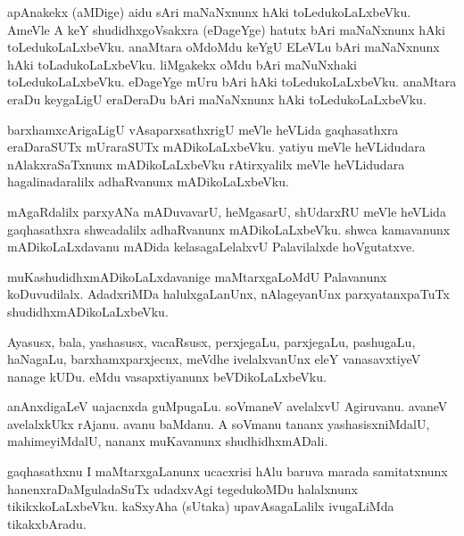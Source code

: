 \documentclass{article}
\begin{document}
\begin{mn}%
apAnakekx (aMDige) aidu sAri maNaNxnunx hAki toLedukoLaLxbeVku. AmeVle A keY shudidhxgoVsakxra 
(eDageYge) hatutx bAri maNaNxnunx hAki toLedukoLaLxbeVku. anaMtara oMdoMdu keYgU ELeVLu bAri 
maNaNxnunx hAki toLadukoLaLxbeVku. liMgakekx oMdu bAri maNuNxhaki toLedukoLaLxbeVku. eDageYge mUru 
bAri hAki toLedukoLaLxbeVku. anaMtara eraDu keygaLigU eraDeraDu bAri maNaNxnunx hAki 
toLedukoLaLxbeVku.
\end{mn}

\begin{mn}%
barxhamxcArigaLigU vAsaparxsathxrigU meVle heVLida gaqhasathxra eraDaraSUTx mUraraSUTx 
mADikoLaLxbeVku. yatiyu meVle heVLidudara nAlakxraSaTxnunx mADikoLaLxbeVku rAtirxyalilx meVle 
heVLidudara hagalinadaralilx adhaRvanunx mADikoLaLxbeVku.
\end{mn}

\begin{mn}%
mAgaRdalilx parxyANa mADuvavarU, heMgasarU, shUdarxRU meVle heVLida gaqhasathxra shwcadalilx 
adhaRvanunx mADikoLaLxbeVku. shwca kamavanunx mADikoLaLxdavanu mADida kelasagaLelalxvU 
Palavilalxde hoVgutatxve.
\end{mn}

\begin{mn}%
muKashudidhxmADikoLaLxdavanige maMtarxgaLoMdU Palavanunx koDuvudilalx. AdadxriMDa halulxgaLanUnx, 
nAlageyanUnx parxyatanxpaTuTx shudidhxmADikoLaLxbeVku.
\end{mn}

\begin{mn}%
Ayasusx, bala, yashasusx, vacaRsusx, perxjegaLu, parxjegaLu, pashugaLu, haNagaLu, 
barxhamxparxjecnx, meVdhe ivelalxvanUnx eleY vanasavxtiyeV nanage kUDu. eMdu vasapxtiyanunx 
beVDikoLaLxbeVku.
\end{mn}

\begin{mn}%
anAnxdigaLeV uajacnxda guMpugaLu. soVmaneV avelalxvU Agiruvanu. avaneV avelalxkUkx rAjanu. avanu 
baMdanu. A soVmanu tananx yashasisxniMdalU, mahimeyiMdalU, nananx muKavanunx shudhidhxmADali.
\end{mn}

\begin{mn}%
gaqhasathxnu I maMtarxgaLanunx ucacxrisi hAlu baruva marada samitatxnunx hanenxraDaMguladaSuTx 
udadxvAgi tegedukoMDu halalxnunx tikikxkoLaLxbeVku. kaSxyAha (sUtaka) upavAsagaLalilx ivugaLiMda 
tikakxbAradu.
\end{mn}
\end{document}
